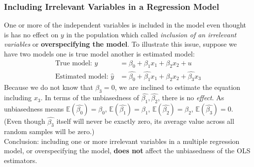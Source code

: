 \documentclass[a4paper, 10pt]{article}
\theoremstyle{definition}	%
\begin{document}
\subsubsection{Including Irrelevant Variables in a Regression Model}
One or more of the independent variables is included in the model even thought is has no effect on $y$ in the population which called \textit{inclusion of an irrelevant variables} or \textbf{overspecifying the model}. To illustrate this issue, suppose we have two models one is true model another is estimated model:
\begin{align}
    \text{True model:\ } y &= \beta_0 + \beta_1 x_1 +  \beta_2 x_2 + u\\
    \text{Estimated model:\ } \hat{y} &= \hat{\beta_0} + \hat{\beta_1} x_1 + \hat{\beta_2} x_2 + \hat{\beta_3} x_3
\end{align}
Because we do not know that $\beta_3 = 0$, we are inclined to estimate the equation including $x_3$. In terms of the unbiasedness of $\hat{\beta_1}, \hat{\beta_2}$, there is no \textit{effect}. As unbiasedness means $\mathbb{E}(\hat{\beta_0}) = \beta_0$, $\mathbb{E}(\hat{\beta_1}) = \beta_1$, $\mathbb{E}(\hat{\beta_2}) = \beta_2$, $\mathbb{E}(\hat{\beta_3}) = 0$. (Even though  $\hat{\beta_3}$ itself will never be exactly zero, its average value across all random samples will be zero.) \\ Conclusion: including one or more irrelevant variables in a multiple regression model, or overspecifying the model, \textbf{does not} affect the unbiasedness of the OLS estimators. 
\end{document}
